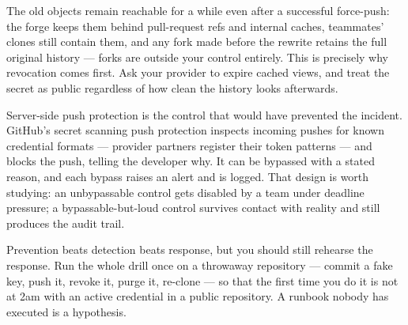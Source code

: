 \begin{secwarn}
The old objects remain reachable for a while even after a successful force-push: the forge keeps them behind pull-request refs and internal caches, teammates' clones still contain them, and any fork made before the rewrite retains the full original history --- forks are outside your control entirely. This is precisely why revocation comes first. Ask your provider to expire cached views, and treat the secret as public regardless of how clean the history looks afterwards.
\end{secwarn}

\begin{prodtip}
Server-side push protection is the control that would have prevented the incident. GitHub's secret scanning push protection inspects incoming pushes for known credential formats --- provider partners register their token patterns --- and blocks the push, telling the developer why. It can be bypassed with a stated reason, and each bypass raises an alert and is logged. That design is worth studying: an unbypassable control gets disabled by a team under deadline pressure; a bypassable-but-loud control survives contact with reality and still produces the audit trail.
\end{prodtip}

\begin{reliability}
Prevention beats detection beats response, but you should still rehearse the response. Run the whole drill once on a throwaway repository --- commit a fake key, push it, revoke it, purge it, re-clone --- so that the first time you do it is not at 2am with an active credential in a public repository. A runbook nobody has executed is a hypothesis.
\end{reliability}

